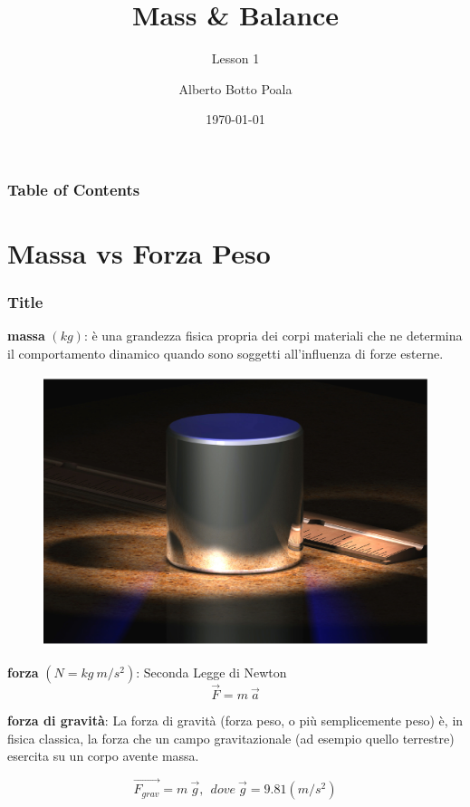 \documentclass{beamer}
\title{Mass \& Balance}
\subtitle{Lesson 1}
\author{Alberto Botto Poala}
\institute{AeC Biella}
\date{\today}
\begin{document}
\begin{frame}
\titlepage
\end{frame} 

\begin{frame}
\frametitle{Table of Contents}
\tableofcontents
\end{frame} 

\section{Massa vs Forza Peso}
\begin{frame}
\frametitle{Title}
\textbf{massa} $(kg)$: è una grandezza fisica propria dei corpi materiali che ne determina il comportamento dinamico quando sono soggetti all'influenza di forze esterne.
\begin{figure}
\includegraphics[scale=0.09]{./images/1kg}
\end{figure}
\pause

\textbf{forza} $(N = kg \ m / s^2 )$: Seconda Legge di Newton 
$$\vec{F} = m \  \vec{a}$$ 
\pause

\textbf{forza di gravità}: La forza di gravità (forza peso, o più semplicemente peso) è, in fisica classica, la forza che un campo gravitazionale (ad esempio quello terrestre) esercita su un corpo avente massa.
\pause

$$\vec{F_{grav}} = m \  \vec{g}, \ \ dove \  \vec{g} = 9.81 (m/s^2)$$ 
\end{frame}
\end{document}
